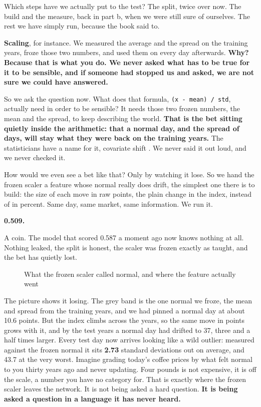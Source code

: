 \documentclass[11pt]{article} %
\begin{document}
Which steps have we actually put to the test? The split, twice over now. The build and the measure, back in part b, when we were still sure of ourselves. The rest we have simply run, because the book said to.

\textbf{Scaling}, for instance. We measured the average and the spread on the training years, froze those two numbers, and used them on every day afterwards. \textbf{Why? Because that is what you do. We never asked what has to be true for it to be sensible, and if someone had stopped us and asked, we are not sure we could have answered.}

So we ask the question now. What does that formula, \texttt{(x - mean) / std}, actually need in order to be sensible? It needs those two frozen numbers, the mean and the spread, to keep describing the world. \textbf{That is the bet sitting quietly inside the arithmetic: that a normal day, and the spread of days, will stay what they were back on the training years.} The statisticians have a name for it, covariate shift \cite{shimodaira:2000}. We never said it out loud, and we never checked it.

How would we even see a bet like that? Only by watching it lose. So we hand the frozen scaler a feature whose normal really does drift, the simplest one there is to build: the size of each move in raw points, the plain change in the index, instead of in percent. Same day, same market, same information. We run it.

\textbf{0.509.}

A coin. The model that scored 0.587 a moment ago now knows nothing at all. Nothing leaked, the split is honest, the scaler was frozen exactly as taught, and the bet has quietly lost.

\begin{figure}[htbp]
\centering

\caption{What the frozen scaler called normal, and where the feature actually went}
\end{figure}


The picture shows it losing. The grey band is the one normal we froze, the mean and spread from the training years, and we had pinned a normal day at about 10.6 points. But the index climbs across the years, so the same move in points grows with it, and by the test years a normal day had drifted to 37, three and a half times larger. Every test day now arrives looking like a wild outlier: measured against the frozen normal it sits \textbf{2.73} standard deviations out on average, and 43.7 at the very worst. Imagine grading today's coffee prices by what felt normal to you thirty years ago and never updating. Four pounds is not expensive, it is off the scale, a number you have no category for. That is exactly where the frozen scaler leaves the network. It is not being asked a hard question. \textbf{It is being asked a question in a language it has never heard.}
\end{document}
